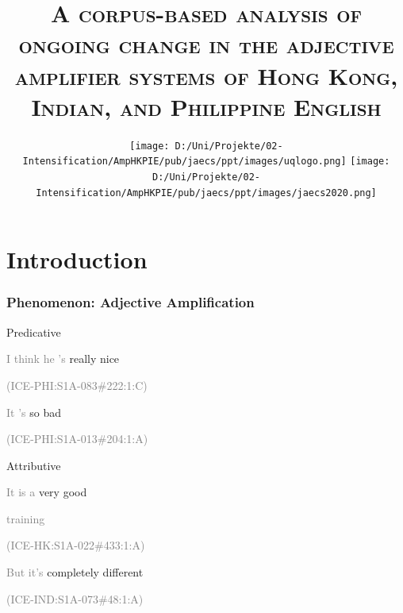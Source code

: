 \documentclass[12pt, table]{beamer}
\author{\color{uq}{\textsc{Dr. Martin Schweinberger \\
slides available at\\
\texttt{www.martinschweinberger.de}\\
\texttt{m.schweinberger@uq.edu.au}\\
\texttt{R} code upon request}}}
\title{\textsc{A corpus-based analysis of ongoing change in the adjective amplifier systems of Hong Kong, Indian, and Philippine English}\\}
\date{\texttt{[image: D:/Uni/Projekte/02-Intensification/AmpHKPIE/pub/jaecs/ppt/images/uqlogo.png]}\hfill
\texttt{[image: D:/Uni/Projekte/02-Intensification/AmpHKPIE/pub/jaecs/ppt/images/jaecs2020.png]}}
\begin{document}
\begin{frame}[plain]
\titlepage 
\end{frame}

\section{Introduction}

\begin{frame}
\frametitle{Phenomenon: Adjective Amplification}
Predicative
\begin{exe}
\ex \textcolor{gray}{I think he 's} \textcolor{uq}{really} nice \textcolor{gray}{\begin{scriptsize}(ICE-PHI:S1A-083\#222:1:C)\end{scriptsize}}
\ex \textcolor{gray}{It 's} \textcolor{uq}{so} bad \textcolor{gray}{\begin{scriptsize}(ICE-PHI:S1A-013\#204:1:A)\end{scriptsize}}
\end{exe}
Attributive
\begin{exe}
\ex \textcolor{gray}{It is a} \textcolor{uq}{very} good \textcolor{gray}{training \begin{scriptsize}(ICE-HK:S1A-022\#433:1:A)\end{scriptsize}}
\ex \textcolor{gray}{But it's} \textcolor{uq}{completely} different \textcolor{gray}{\begin{scriptsize}(ICE-IND:S1A-073\#48:1:A)\end{scriptsize}}
\end{exe}
\end{frame}

\end{document}
